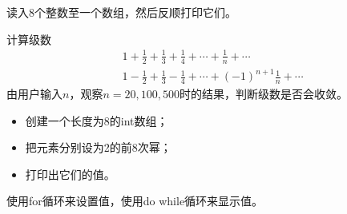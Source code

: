 % 


\begin{frame}[fragile]
\begin{biancheng}[10]
读入8个整数至一个数组，然后反顺打印它们。
\end{biancheng}
\end{frame}

% 

\begin{frame}[fragile]
\begin{biancheng}[11]
计算级数
$$
\begin{aligned}
&1+\frac12 + \frac13 + \frac14 + \cdots + \frac1n + \cdots\\
&1-\frac12 + \frac13 - \frac14 + \cdots + (-1)^{n+1}\frac1n + \cdots
\end{aligned}
$$
由用户输入$n$，观察$n=20,100,500$时的结果，判断级数是否会收敛。
\end{biancheng}
\end{frame}

% 


\begin{frame}[fragile]
\begin{biancheng}[12]
\begin{itemize}
\item 创建一个长度为8的int数组；\\[.1in]
\item 把元素分别设为2的前8次幂；\\[.1in]
\item 打印出它们的值。
\end{itemize}
使用for循环来设置值，使用do while循环来显示值。
\end{biancheng}
\end{frame}

% 


